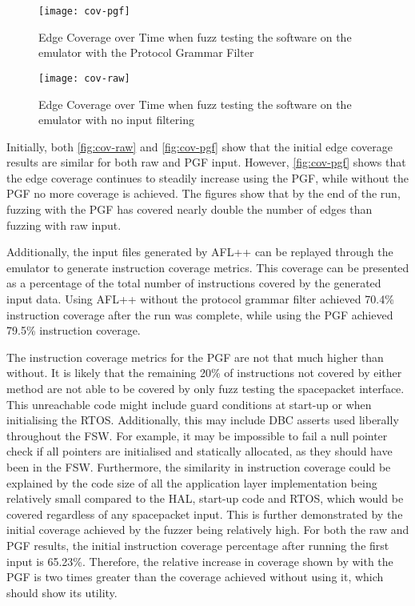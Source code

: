 \documentclass[../report.tex]{subfiles}
\begin{document}
\begin{figure}[H]
    \centering
    \texttt{[image: cov-pgf]}
    \caption{Edge Coverage over Time when fuzz testing the software on the
    emulator with the Protocol Grammar Filter}
    \label{fig:cov-pgf}
\end{figure}

\begin{figure}[H]
    \centering
    \texttt{[image: cov-raw]}
    \caption{Edge Coverage over Time when fuzz testing the software on the
    emulator with no input filtering}
    \label{fig:cov-raw}
\end{figure}

Initially, both \autoref{fig:cov-raw} and \autoref{fig:cov-pgf} show that the
initial edge coverage results are similar for both raw and PGF input. However,
\autoref{fig:cov-pgf} shows that the edge coverage continues to steadily
increase using the PGF, while without the PGF no more coverage is achieved. The
figures show that by the end of the run, fuzzing with the PGF has covered
nearly double the number of edges than fuzzing with raw input.

Additionally, the input files generated by AFL++ can be replayed through the
emulator to generate instruction coverage metrics. This coverage can be
presented as a percentage of the total number of instructions covered by the
generated input data. Using AFL++ without the protocol grammar filter achieved
70.4\% instruction coverage after the run was complete, while using the PGF
achieved 79.5\% instruction coverage.

The instruction coverage metrics for the PGF are not that much higher than
without. It is likely that the remaining 20\% of instructions not covered by
either method are not able to be covered by only fuzz testing the spacepacket
interface. This unreachable code might include guard conditions at start-up or
when initialising the RTOS. Additionally, this may include DBC asserts used
liberally throughout the FSW. For example, it may be impossible to fail a null
pointer check if all pointers are initialised and statically allocated, as they
should have been in the FSW. Furthermore, the similarity in instruction
coverage could be explained by the code size of all the application layer
implementation being relatively small compared to the HAL, start-up code and
RTOS, which would be covered regardless of any spacepacket input. This is
further demonstrated by the initial coverage achieved by the fuzzer being
relatively high. For both the raw and PGF results, the initial instruction
coverage percentage after running the first input is 65.23\%. Therefore, the
relative increase in coverage shown by with the PGF is two times greater than
the coverage achieved without using it, which should show its utility.
\end{document}
